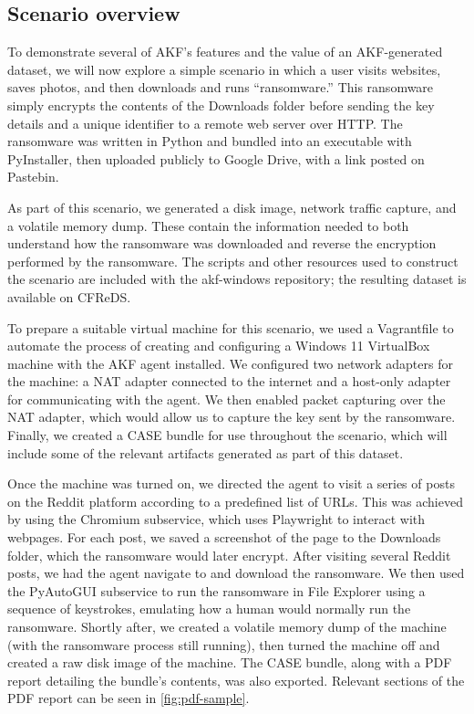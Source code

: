 \documentclass[final,5p,times,twocolumn]{elsarticle}
\begin{document}
\subsection{Scenario overview}\label{scenario-overview}

To demonstrate several of AKF's features and the value of an
AKF-generated dataset, we will now explore a simple scenario in which a
user visits websites, saves photos, and then downloads and runs
``ransomware.'' This ransomware simply encrypts the contents of the
Downloads folder before sending the key details and a unique identifier
to a remote web server over HTTP. The ransomware was written in Python
and bundled into an executable with PyInstaller, then uploaded publicly
to Google Drive, with a link posted on Pastebin.

As part of this scenario, we generated a disk image, network traffic
capture, and a volatile memory dump. These contain the information
needed to both understand how the ransomware was downloaded and reverse
the encryption performed by the ransomware. The scripts and other
resources used to construct the scenario are included with the
akf-windows repository; the resulting dataset is available on CFReDS.

To prepare a suitable virtual machine for this scenario, we used a
Vagrantfile to automate the process of creating and configuring a
Windows 11 VirtualBox machine with the AKF agent installed. We
configured two network adapters for the machine: a NAT adapter connected
to the internet and a host-only adapter for communicating with the
agent. We then enabled packet capturing over the NAT adapter, which
would allow us to capture the key sent by the ransomware. Finally, we
created a CASE bundle for use throughout the scenario, which will
include some of the relevant artifacts generated as part of this
dataset.

Once the machine was turned on, we directed the agent to visit a series
of posts on the Reddit platform according to a predefined list of URLs.
This was achieved by using the Chromium subservice, which uses
Playwright to interact with webpages. For each post, we saved a
screenshot of the page to the Downloads folder, which the ransomware
would later encrypt. After visiting several Reddit posts, we had the
agent navigate to and download the ransomware. We then used the
PyAutoGUI subservice to run the ransomware in File Explorer using a
sequence of keystrokes, emulating how a human would normally run the
ransomware. Shortly after, we created a volatile memory dump of the
machine (with the ransomware process still running), then turned the
machine off and created a raw disk image of the machine. The CASE
bundle, along with a PDF report detailing the bundle's contents, was
also exported. Relevant sections of the PDF report can be seen in
\autoref{fig:pdf-sample}.
\end{document}
